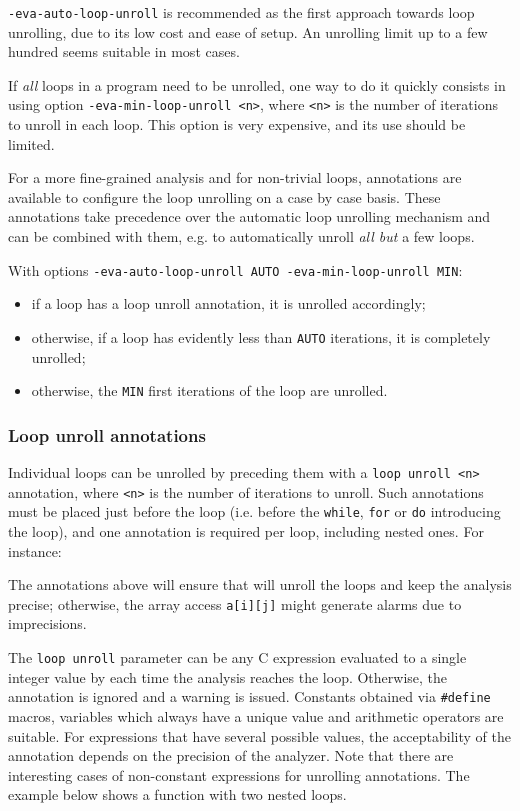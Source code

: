 \documentclass{frama-c-book}
\begin{document}
\lstinline|-eva-auto-loop-unroll| is recommended as the first approach towards
loop unrolling, due to its low cost and ease of setup. An unrolling limit
up to a few hundred seems suitable in most cases.

If \emph{all} loops in a program need to be unrolled, one way to do it quickly
consists in using option \lstinline|-eva-min-loop-unroll <n>|,
where \lstinline|<n>| is the number of iterations to unroll in each loop.
This option is very expensive, and its use should be limited.

For a more fine-grained analysis and for non-trivial loops,
annotations are available to configure the loop unrolling on a case by case
basis.
These annotations take precedence over the automatic loop unrolling mechanism
and can be combined with them, e.g. to automatically unroll {\em all but} a few
loops.

With options \lstinline|-eva-auto-loop-unroll AUTO -eva-min-loop-unroll MIN|:
\begin{itemize}
\item if a loop has a loop unroll annotation, it is unrolled accordingly;
\item otherwise, if a loop has evidently less than \lstinline|AUTO| iterations,
  it is completely unrolled;
\item otherwise, the \lstinline|MIN| first iterations of the loop are unrolled.
\end{itemize}

\subsubsection{Loop unroll annotations}

Individual loops can be unrolled by preceding them with a
\lstinline|loop unroll <n>| annotation, where \lstinline|<n>| is the number
of iterations to unroll.
Such annotations must be placed just before the loop (i.e. before the
\lstinline|while|, \lstinline|for| or \lstinline|do| introducing the loop),
and one annotation is required per loop, including nested ones. For instance:


The annotations above will ensure
that \Eva{} will unroll the loops and keep the analysis precise; otherwise,
the array access \lstinline|a[i][j]| might generate alarms due to imprecisions.

The \lstinline|loop unroll| parameter can be any C expression evaluated to a
single integer value by \Eva{} each time the analysis reaches the loop.
Otherwise, the annotation is ignored and a warning is issued.
Constants obtained via \lstinline|#define| macros, variables which always have
a unique value and arithmetic operators are suitable.
For expressions that have several possible values,
the acceptability of the annotation depends on the precision of the analyzer.
Note that there are interesting cases of non-constant expressions for
unrolling annotations. The example below shows a function with two nested loops.
\end{document}
